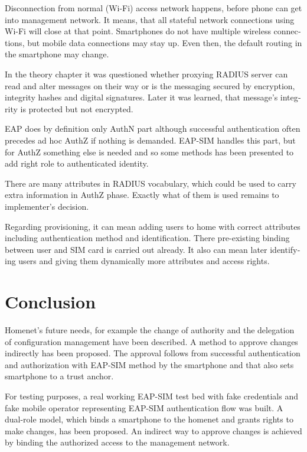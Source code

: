 \documentclass[12pt,a4paper,english]{tutthesis}
\begin{document}
\begin{otherlanguage}{english}
Disconnection from normal (Wi-Fi) access network happens, before phone can get
into management network. It means, that all stateful network
connections using Wi-Fi will close at that point. Smartphones do not
have multiple wireless connections, but mobile data connections may 
stay up. Even then, the default routing in the smartphone may change.

In the theory chapter it was questioned whether proxying RADIUS server
can read and alter messages on their way or is the messaging secured
by encryption, integrity hashes and digital signatures.
Later it was learned, that message's integrity is protected but not encrypted.

EAP does by definition only AuthN part although successful
authentication often precedes ad hoc AuthZ if nothing is demanded.
EAP-SIM handles this part, but for AuthZ something else is needed
and so some methods has been presented to add right role to 
authenticated identity.

There are many attributes in RADIUS vocabulary, which could be 
used to carry extra information in AuthZ phase. Exactly what 
of them is used remains to implementer's  decision.

Regarding provisioning, it can mean adding users to home with correct
attributes including authentication method and identification.
There pre-existing binding between user and SIM card is carried out
already. 
It also can mean later identifying users and giving them 
dynamically more attributes and access rights.


\chapter{Conclusion}
\label{sec-7}




Homenet's future needs, for example  the change of authority and the
delegation of configuration management have been described.
A method to approve changes indirectly has been proposed. The approval
follows from successful authentication and authorization with EAP-SIM
method by the smartphone and that also sets smartphone to a trust anchor.


For testing purposes, a real working EAP-SIM test bed with fake credentials and
fake mobile operator representing EAP-SIM authentication flow was
built. A dual-role model, which binds a smartphone to the homenet and
grants rights to make changes, has been proposed.  
An indirect way to approve changes is achieved by binding the authorized
access to the management network.


\end{otherlanguage}
\end{document}

